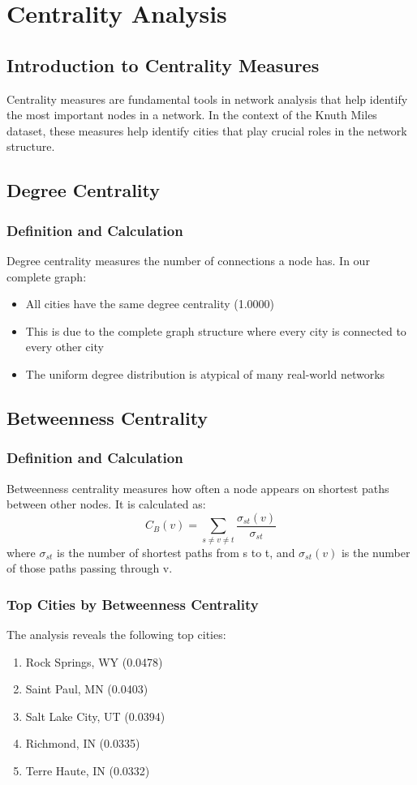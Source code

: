 \chapter{Centrality Analysis}

\section{Introduction to Centrality Measures}
Centrality measures are fundamental tools in network analysis that help identify the most important nodes in a network. In the context of the Knuth Miles dataset, these measures help identify cities that play crucial roles in the network structure.

\section{Degree Centrality}
\subsection{Definition and Calculation}
Degree centrality measures the number of connections a node has. In our complete graph:
\begin{itemize}
    \item All cities have the same degree centrality (1.0000)
    \item This is due to the complete graph structure where every city is connected to every other city
    \item The uniform degree distribution is atypical of many real-world networks
\end{itemize}

\section{Betweenness Centrality}
\subsection{Definition and Calculation}
Betweenness centrality measures how often a node appears on shortest paths between other nodes. It is calculated as:
\begin{equation}
C_B(v) = \sum_{s \neq v \neq t} \frac{\sigma_{st}(v)}{\sigma_{st}}
\end{equation}
where $\sigma_{st}$ is the number of shortest paths from s to t, and $\sigma_{st}(v)$ is the number of those paths passing through v.

\subsection{Top Cities by Betweenness Centrality}
The analysis reveals the following top cities:
\begin{enumerate}
    \item Rock Springs, WY (0.0478)
    \item Saint Paul, MN (0.0403)
    \item Salt Lake City, UT (0.0394)
    \item Richmond, IN (0.0335)
    \item Terre Haute, IN (0.0332)
\end{enumerate}

